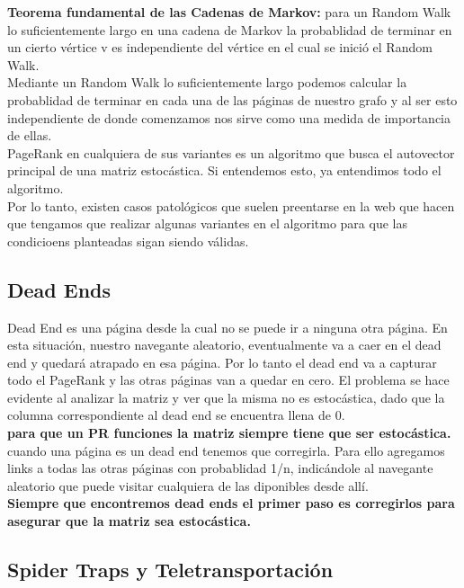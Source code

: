 \documentclass[titlepage,a4paper]{article}
\begin{document}
\textbf{Teorema fundamental de las Cadenas de Markov: }para un Random Walk lo suficientemente largo en una cadena de Markov la probablidad de terminar en un cierto vértice v es  independiente del vértice en el cual se inició el Random Walk. \\

Mediante un Random Walk lo suficientemente largo podemos calcular la probablidad de terminar en cada una de las páginas de nuestro grafo y al ser esto independiente de donde comenzamos nos sirve como una medida de importancia de ellas. \\
 
PageRank en cualquiera de sus variantes es un algoritmo que busca el autovector principal de una matriz estocástica. Si entendemos esto, ya entendimos todo el algoritmo. \\

Por lo tanto, existen casos patológicos que suelen preentarse en la web que hacen que tengamos que realizar algunas variantes en el algoritmo para que las condicioens planteadas sigan siendo válidas. 

\subsection*{Dead Ends}
Dead End es una página desde la cual no se puede ir a ninguna otra página. En esta situación, nuestro navegante aleatorio, eventualmente va a caer en el dead end y quedará atrapado en esa página. Por lo tanto el dead end va a capturar todo el PageRank y las otras páginas van a quedar en cero. El problema se hace evidente al analizar la matriz y ver que la misma no es  estocástica, dado que la columna correspondiente al dead end se encuentra llena de 0. \\

\textbf{para que un PR funciones la matriz siempre tiene que ser estocástica. }cuando una página es un dead end tenemos que corregirla. Para ello agregamos links a todas las otras páginas con probablidad 1/n, indicándole al navegante aleatorio que puede visitar cualquiera de las diponibles desde allí. \\

\textbf{Siempre que encontremos dead ends el primer paso es corregirlos para asegurar que la matriz sea estocástica. }

\subsection*{Spider Traps y Teletransportación}
\end{document}
